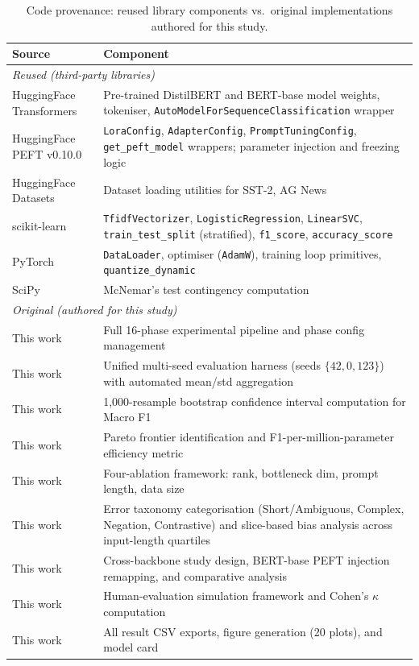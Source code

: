\documentclass[conference]{IEEEtran}
\begin{document}
\begin{table}[ht]
\centering
\caption{Code provenance: reused library components vs.\ original implementations authored for this study.}
\label{tab:code_provenance}
\renewcommand{\arraystretch}{1.2}
\begin{tabular}{p{2.1cm}p{5.2cm}}
\toprule
\textbf{Source} & \textbf{Component}\\
\midrule
\multicolumn{2}{l}{\textit{Reused (third-party libraries)}}\\
HuggingFace Transformers & Pre-trained DistilBERT and BERT-base model weights, tokeniser, \texttt{AutoModelForSequenceClassification} wrapper\\
HuggingFace PEFT v0.10.0 & \texttt{LoraConfig}, \texttt{AdapterConfig}, \texttt{PromptTuningConfig}, \texttt{get\_peft\_model} wrappers; parameter injection and freezing logic\\
HuggingFace Datasets & Dataset loading utilities for SST-2, AG News\\
scikit-learn & \texttt{TfidfVectorizer}, \texttt{LogisticRegression}, \texttt{LinearSVC}, \texttt{train\_test\_split} (stratified), \texttt{f1\_score}, \texttt{accuracy\_score}\\
PyTorch & \texttt{DataLoader}, optimiser (\texttt{AdamW}), training loop primitives, \texttt{quantize\_dynamic}\\
SciPy & McNemar's test contingency computation\\
\midrule
\multicolumn{2}{l}{\textit{Original (authored for this study)}}\\
This work & Full 16-phase experimental pipeline and phase config management\\
This work & Unified multi-seed evaluation harness (seeds $\{42,0,123\}$) with automated mean/std aggregation\\
This work & 1{,}000-resample bootstrap confidence interval computation for Macro F1\\
This work & Pareto frontier identification and F1-per-million-parameter efficiency metric\\
This work & Four-ablation framework: rank, bottleneck dim, prompt length, data size\\
This work & Error taxonomy categorisation (Short/Ambiguous, Complex, Negation, Contrastive) and slice-based bias analysis across input-length quartiles\\
This work & Cross-backbone study design, BERT-base PEFT injection remapping, and comparative analysis\\
This work & Human-evaluation simulation framework and Cohen's $\kappa$ computation\\
This work & All result CSV exports, figure generation (20 plots), and model card\\
\bottomrule
\end{tabular}
\end{table}
\end{document}
